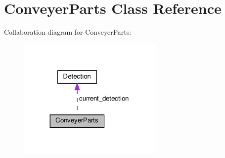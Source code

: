 \hypertarget{classConveyerParts}{}\section{Conveyer\+Parts Class Reference}
\label{classConveyerParts}


Collaboration diagram for Conveyer\+Parts\+:\nopagebreak
\begin{figure}[H]
\begin{center}
\leavevmode
\includegraphics[width=200pt]{classConveyerParts__coll__graph}
\end{center}
\end{figure}
